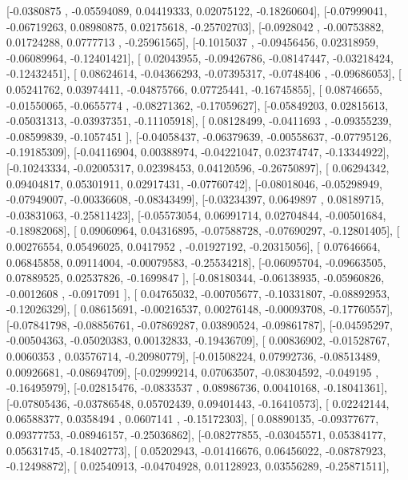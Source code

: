 \documentclass{article}
\begin{document}
       [-0.0380875 , -0.05594089,  0.04419333,  0.02075122, -0.18260604],
       [-0.07999041, -0.06719263,  0.08980875,  0.02175618, -0.25702703],
       [-0.0928042 , -0.00753882,  0.01724288,  0.0777713 , -0.25961565],
       [-0.1015037 , -0.09456456,  0.02318959, -0.06089964, -0.12401421],
       [ 0.02043955, -0.09426786, -0.08147447, -0.03218424, -0.12432451],
       [ 0.08624614, -0.04366293, -0.07395317, -0.0748406 , -0.09686053],
       [ 0.05241762,  0.03974411, -0.04875766,  0.07725441, -0.16745855],
       [ 0.08746655, -0.01550065, -0.0655774 , -0.08271362, -0.17059627],
       [-0.05849203,  0.02815613, -0.05031313, -0.03937351, -0.11105918],
       [ 0.08128499, -0.0411693 , -0.09355239, -0.08599839, -0.1057451 ],
       [-0.04058437, -0.06379639, -0.00558637, -0.07795126, -0.19185309],
       [-0.04116904,  0.00388974, -0.04221047,  0.02374747, -0.13344922],
       [-0.10243334, -0.02005317,  0.02398453,  0.04120596, -0.26750897],
       [ 0.06294342,  0.09404817,  0.05301911,  0.02917431, -0.07760742],
       [-0.08018046, -0.05298949, -0.07949007, -0.00336608, -0.08343499],
       [-0.03234397,  0.0649897 ,  0.08189715, -0.03831063, -0.25811423],
       [-0.05573054,  0.06991714,  0.02704844, -0.00501684, -0.18982068],
       [ 0.09060964,  0.04316895, -0.07588728, -0.07690297, -0.12801405],
       [ 0.00276554,  0.05496025,  0.0417952 , -0.01927192, -0.20315056],
       [ 0.07646664,  0.06845858,  0.09114004, -0.00079583, -0.25534218],
       [-0.06095704, -0.09663505,  0.07889525,  0.02537826, -0.1699847 ],
       [-0.08180344, -0.06138935, -0.05960826, -0.0012608 , -0.0917091 ],
       [ 0.04765032, -0.00705677, -0.10331807, -0.08892953, -0.12026329],
       [ 0.08615691, -0.00216537,  0.00276148, -0.00093708, -0.17760557],
       [-0.07841798, -0.08856761, -0.07869287,  0.03890524, -0.09861787],
       [-0.04595297, -0.00504363, -0.05020383,  0.00132833, -0.19436709],
       [ 0.00836902, -0.01528767,  0.0060353 ,  0.03576714, -0.20980779],
       [-0.01508224,  0.07992736, -0.08513489,  0.00926681, -0.08694709],
       [-0.02999214,  0.07063507, -0.08304592, -0.049195  , -0.16495979],
       [-0.02815476, -0.0833537 ,  0.08986736,  0.00410168, -0.18041361],
       [-0.07805436, -0.03786548,  0.05702439,  0.09401443, -0.16410573],
       [ 0.02242144,  0.06588377,  0.0358494 ,  0.0607141 , -0.15172303],
       [ 0.08890135, -0.09377677,  0.09377753, -0.08946157, -0.25036862],
       [-0.08277855, -0.03045571,  0.05384177,  0.05631745, -0.18402773],
       [ 0.05202943, -0.01416676,  0.06456022, -0.08787923, -0.12498872],
       [ 0.02540913, -0.04704928,  0.01128923,  0.03556289, -0.25871511],
\end{document}
